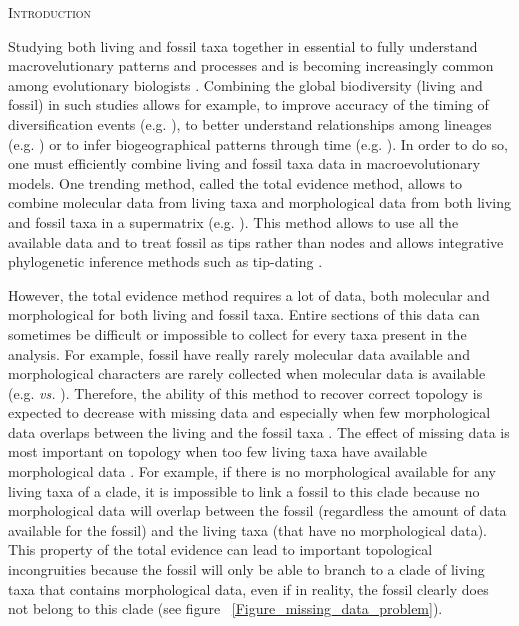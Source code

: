 \documentclass[12pt,letterpaper]{article}
\renewcommand{\section}[1]{%
\bigskip
\begin{center}
\begin{Large}
\normalfont\scshape #1
\medskip
\end{Large}
\end{center}}
\begin{document}
\section{Introduction}
Studying both living and fossil taxa together in essential to fully understand macrovelutionary patterns and processes and is becoming increasingly common among evolutionary biologists \cite{jacksonwhat2006,quentaldiversity2010,dietlconservation2011,slaterunifying2013,fritzdiversity2013}. Combining the global biodiversity (living and fossil) in such studies allows for example, to improve accuracy of the timing of diversification events (e.g. \cite{ronquista2012}), to better understand relationships among lineages (e.g. \cite{beckancient2014}) or to infer biogeographical patterns through time (e.g. \cite{Meseguer01032015}).
In order to do so, one must efficiently combine living and fossil taxa data in macroevolutionary models. One trending method, called the total evidence method, allows to combine molecular data from living taxa and morphological data from both living and fossil taxa in a supermatrix (e.g. \cite{pyrondivergence2011,ronquista2012,schragocombining2013,slaterunifying2013,beckancient2014,Meseguer01032015}). This method allows to use all the available data and to treat fossil as tips rather than nodes and allows integrative phylogenetic inference methods such as tip-dating \cite{ronquista2012,Drummond01082012,BEASTmaster}.

However, the total evidence method requires a lot of data, both molecular and morphological for both living and fossil taxa. Entire sections of this data can sometimes be difficult or impossible to collect for every taxa present in the analysis. For example, fossil have really rarely molecular data available and morphological characters are rarely collected when molecular data is available (e.g. \cite{O'Leary08022013} \textit{vs.} \cite{meredithimpacts2011}). Therefore, the ability of this method to recover correct topology is expected to decrease with missing data and especially when few morphological data overlaps between the living and the fossil taxa \cite{GuillermeCooper}. %
The effect of missing data is most important on topology when too few living taxa have available morphological data \cite{GuillermeCooper}.
For example, if there is no morphological available for any living taxa of a clade, it is impossible to link a fossil to this clade because no morphological data will overlap between the fossil (regardless the amount of data available for the fossil) and the living taxa (that have no morphological data). This property of the total evidence can lead to important topological incongruities because the fossil will only be able to branch to a clade of living taxa that contains morphological data, even if in reality, the fossil clearly does not belong to this clade (see figure ~\ref{Figure_missing_data_problem}).
\end{document}
